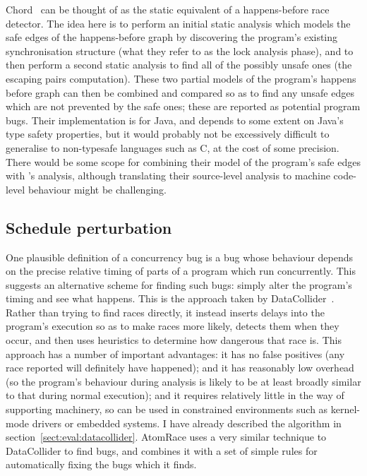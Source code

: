 
Chord~\cite{Naik2006} can be thought of as the static equivalent of a
happens-before race detector.  The idea here is to perform an initial
static analysis which models the safe edges of the happens-before
graph by discovering the program's existing synchronisation structure
(what they refer to as the lock analysis phase), and to then perform a
second static analysis to find all of the possibly unsafe ones (the
escaping pairs computation).  These two partial models of the
program's happens before graph can then be combined and compared so as
to find any unsafe edges which are not prevented by the safe ones;
these are reported as potential program bugs.  Their implementation is
for Java, and depends to some extent on Java's type safety properties,
but it would probably not be excessively difficult to generalise to
non-typesafe languages such as C, at the cost of some precision.
There would be some scope for combining their model of the program's
safe edges with {\technique}'s analysis, although translating their
source-level analysis to machine code-level behaviour might be
challenging.

\subsection{Schedule perturbation}

One plausible definition of a concurrency bug is a bug whose behaviour
depends on the precise relative timing of parts of a program which run
concurrently.  This suggests an alternative scheme for finding such
bugs: simply alter the program's timing and see what happens.  This is
the approach taken by DataCollider~\cite{Erickson2010}.  Rather than
trying to find races directly, it instead inserts delays into the
program's execution so as to make races more likely, detects them when
they occur, and then uses heuristics to determine how dangerous that
race is.  This approach has a number of important advantages: it has
no false positives (any race reported will definitely have happened);
and it has reasonably low overhead (so the program's behaviour during
analysis is likely to be at least broadly similar to that during
normal execution); and it requires relatively little in the way of
supporting machinery, so can be used in constrained environments such
as kernel-mode drivers or embedded systems.  I have already described
the algorithm in section~\ref{sect:eval:datacollider}.
AtomRace\cite{Letko2008} uses a very similar technique to DataCollider
to find bugs, and combines it with a set of simple rules for
automatically fixing the bugs which it finds.


